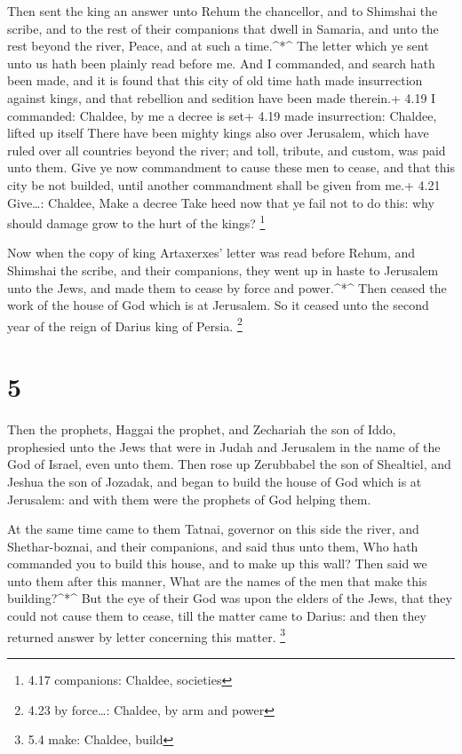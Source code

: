  Then sent the king an answer unto Rehum the chancellor,
and to Shimshai the scribe, and to the rest of their companions that
dwell in Samaria, and unto the rest beyond the river, Peace, and at such
a time.\^{}*\^{}  The letter which ye sent unto us hath
been plainly read before me.  And I commanded, and search
hath been made, and it is found that this city of old time hath made
insurrection against kings, and that rebellion and sedition have been
made therein.+ 4.19 I commanded: Chaldee, by me a decree is set+ 4.19
made insurrection: Chaldee, lifted up itself  There have
been mighty kings also over Jerusalem, which have ruled over all
countries beyond the river; and toll, tribute, and custom, was paid unto
them.  Give ye now commandment to cause these men to cease,
and that this city be not builded, until another commandment shall be
given from me.+ 4.21 Give\ldots: Chaldee, Make a decree 
Take heed now that ye fail not to do this: why should damage grow to the
hurt of the kings? \footnote{4.17 companions: Chaldee, societies}

 Now when the copy of king Artaxerxes' letter was read
before Rehum, and Shimshai the scribe, and their companions, they went
up in haste to Jerusalem unto the Jews, and made them to cease by force
and power.\^{}*\^{}  Then ceased the work of the house of
God which is at Jerusalem. So it ceased unto the second year of the
reign of Darius king of Persia. \footnote{4.23 by force\ldots: Chaldee,
  by arm and power}

\hypertarget{section-4}{%
\section{5}\label{section-4}}

 Then the prophets, Haggai the prophet, and Zechariah the
son of Iddo, prophesied unto the Jews that were in Judah and Jerusalem
in the name of the God of Israel, even unto them.  Then rose
up Zerubbabel the son of Shealtiel, and Jeshua the son of Jozadak, and
began to build the house of God which is at Jerusalem: and with them
were the prophets of God helping them.

 At the same time came to them Tatnai, governor on this side
the river, and Shethar-boznai, and their companions, and said thus unto
them, Who hath commanded you to build this house, and to make up this
wall?  Then said we unto them after this manner, What are
the names of the men that make this building?\^{}*\^{}  But
the eye of their God was upon the elders of the Jews, that they could
not cause them to cease, till the matter came to Darius: and then they
returned answer by letter concerning this matter. \footnote{5.4 make:
  Chaldee, build}

